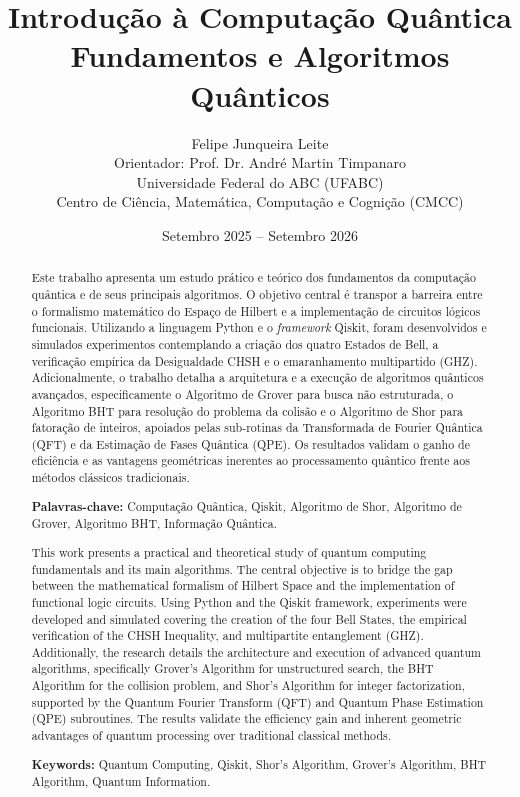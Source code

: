 \documentclass[12pt, a4paper]{article}
\title{Introdução à Computação Quântica \\
\vspace{0.5cm}
\large Fundamentos e Algoritmos Quânticos}
\author{Felipe Junqueira Leite \\
    Orientador: Prof. Dr. André Martin Timpanaro \\[0.5cm]
    \small Universidade Federal do ABC (UFABC) \\
    \small Centro de Ciência, Matemática, Computação e Cognição (CMCC)
}
\date{Setembro 2025 -- Setembro 2026}
\begin{document}
\maketitle

\begin{abstract}
Este trabalho apresenta um estudo prático e teórico dos fundamentos da computação quântica e de seus principais algoritmos. O objetivo central é transpor a barreira entre o formalismo matemático do Espaço de Hilbert e a implementação de circuitos lógicos funcionais. Utilizando a linguagem Python e o \textit{framework} Qiskit, foram desenvolvidos e simulados experimentos contemplando a criação dos quatro Estados de Bell, a verificação empírica da Desigualdade CHSH e o emaranhamento multipartido (GHZ). Adicionalmente, o trabalho detalha a arquitetura e a execução de algoritmos quânticos avançados, especificamente o Algoritmo de Grover para busca não estruturada, o Algoritmo BHT para resolução do problema da colisão e o Algoritmo de Shor para fatoração de inteiros, apoiados pelas sub-rotinas da Transformada de Fourier Quântica (QFT) e da Estimação de Fases Quântica (QPE). Os resultados validam o ganho de eficiência e as vantagens geométricas inerentes ao processamento quântico frente aos métodos clássicos tradicionais.

\vspace{0.5cm}
\noindent\textbf{Palavras-chave:} Computação Quântica, Qiskit, Algoritmo de Shor, Algoritmo de Grover, Algoritmo BHT, Informação Quântica.
\end{abstract}

\renewcommand{\abstractname}{Abstract}
\begin{abstract}
This work presents a practical and theoretical study of quantum computing fundamentals and its main algorithms. The central objective is to bridge the gap between the mathematical formalism of Hilbert Space and the implementation of functional logic circuits. Using Python and the Qiskit framework, experiments were developed and simulated covering the creation of the four Bell States, the empirical verification of the CHSH Inequality, and multipartite entanglement (GHZ). Additionally, the research details the architecture and execution of advanced quantum algorithms, specifically Grover's Algorithm for unstructured search, the BHT Algorithm for the collision problem, and Shor's Algorithm for integer factorization, supported by the Quantum Fourier Transform (QFT) and Quantum Phase Estimation (QPE) subroutines. The results validate the efficiency gain and inherent geometric advantages of quantum processing over traditional classical methods.

\vspace{0.5cm}
\noindent\textbf{Keywords:} Quantum Computing, Qiskit, Shor's Algorithm, Grover's Algorithm, BHT Algorithm, Quantum Information.
\end{abstract}
\end{document}

